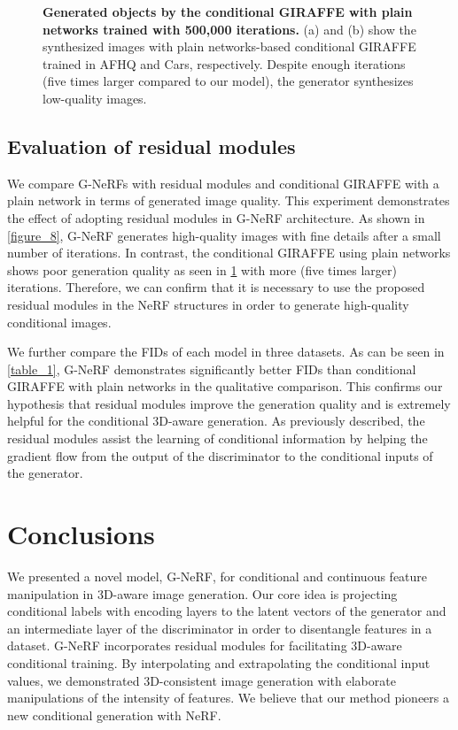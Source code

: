 \documentclass[nohyperref]{article}
\theoremstyle{plain}
\theoremstyle{definition}
\theoremstyle{remark}
\begin{document}
\begin{figure}[h]
\vskip 0.2in
\begin{center}
\vskip -0.15in
\caption{\textbf{Generated objects by the conditional GIRAFFE with plain networks trained with 500,000 iterations.} (a) and (b) show the synthesized images with plain networks-based conditional GIRAFFE trained in AFHQ and Cars, respectively. Despite enough iterations (five times larger compared to our model), the generator synthesizes low-quality images.}
\label{figure_9}
\end{center}
\vskip -0.2in
\end{figure}



\subsection{Evaluation of residual modules}
We compare G-NeRFs with residual modules and conditional GIRAFFE with a plain network in terms of generated image quality. This experiment demonstrates the effect of adopting residual modules \cite{he2016deep, mescheder2018training} in G-NeRF architecture. As shown in \cref{figure_8}, G-NeRF generates high-quality images with fine details after a small number of iterations. In contrast, the conditional GIRAFFE using plain networks shows poor generation quality as seen in \cref{figure_9} with more (five times larger) iterations. Therefore, we can confirm that it is necessary to use the proposed residual modules in the NeRF structures in order to generate high-quality conditional images. 

We further compare the FIDs of each model in three datasets. As can be seen in \cref{table_1}, G-NeRF demonstrates significantly better FIDs than conditional GIRAFFE with plain networks in the qualitative comparison. This confirms our hypothesis that residual modules improve the generation quality and is extremely helpful for the conditional 3D-aware generation. As previously described, the residual modules assist the learning of conditional information by helping the gradient flow from the output of the discriminator to the conditional inputs of the generator.


\section{Conclusions}
We presented a novel model, G-NeRF, for conditional and continuous feature manipulation in 3D-aware image generation. Our core idea is projecting conditional labels with encoding layers to the latent vectors of the generator and an intermediate layer of the discriminator in order to disentangle features in a dataset. G-NeRF incorporates residual modules for facilitating 3D-aware conditional training. By interpolating and extrapolating the conditional input values, we demonstrated 3D-consistent image generation with elaborate manipulations of the intensity of features. We believe that our method pioneers a new conditional generation with NeRF. 
\end{document}
